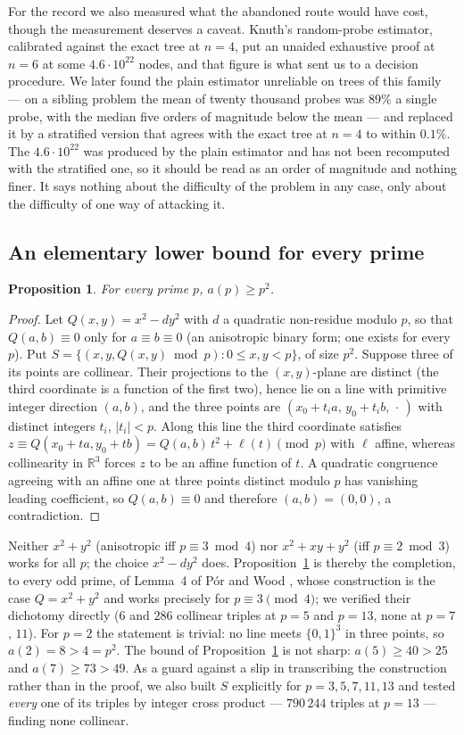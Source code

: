 \documentclass[11pt,a4paper]{article}
\newtheorem{proposition}[theorem]{Proposition}
\begin{document}
For the record we also measured what the abandoned route would have cost, though the measurement deserves a
caveat.  Knuth's random-probe estimator, calibrated against the exact tree at $n=4$, put an unaided exhaustive
proof at $n=6$ at some $4.6\cdot10^{22}$ nodes, and that figure is what sent us to a decision procedure.  We
later found the plain estimator unreliable on trees of this family --- on a sibling problem the mean of twenty
thousand probes was $89\%$ a single probe, with the median five orders of magnitude below the mean --- and
replaced it by a stratified version that agrees with the exact tree at $n=4$ to within $0.1\%$.  The
$4.6\cdot10^{22}$ was produced by the plain estimator and has not been recomputed with the stratified one, so
it should be read as an order of magnitude and nothing finer.  It says nothing about the difficulty of the
problem in any case, only about the difficulty of one way of attacking it.

\subsection{An elementary lower bound for every prime}\label{s:prime}
\begin{proposition}\label{p:alg}
For every prime $p$, $a(p)\ge p^2$.
\end{proposition}
\begin{proof}
Let $Q(x,y)=x^2-dy^2$ with $d$ a quadratic non-residue modulo $p$, so that $Q(a,b)\equiv0$ only for
$a\equiv b\equiv0$ (an anisotropic binary form; one exists for every $p$).  Put
$S=\{(x,y,Q(x,y)\bmod p):0\le x,y<p\}$, of size $p^2$.  Suppose three of its points are collinear.  Their
projections to the $(x,y)$-plane are distinct (the third coordinate is a function of the first two), hence lie
on a line with primitive integer direction $(a,b)$, and the three points are $(x_0+t_ia,\,y_0+t_ib,\,\cdot\,)$
with distinct integers $t_i$, $|t_i|<p$.  Along this line the third coordinate satisfies
$z\equiv Q(x_0+ta,y_0+tb)=Q(a,b)\,t^2+\ell(t)\pmod p$ with $\ell$ affine, whereas collinearity in
$\mathbb R^3$ forces $z$ to be an affine function of $t$.  A quadratic congruence agreeing with an affine one
at three points distinct modulo $p$ has vanishing leading coefficient, so $Q(a,b)\equiv0$ and therefore
$(a,b)=(0,0)$, a contradiction.
\end{proof}
Neither $x^2+y^2$ (anisotropic iff $p\equiv3\bmod 4$) nor $x^2+xy+y^2$ (iff $p\equiv2\bmod3$) works for all
$p$; the choice $x^2-dy^2$ does.  Proposition~\ref{p:alg} is thereby the completion, to every odd prime, of
Lemma~4 of P\'or and Wood \cite{PorWood}, whose construction is the case $Q=x^2+y^2$ and works precisely for
$p\equiv3\pmod4$; we verified their dichotomy directly ($6$ and $286$ collinear triples at $p=5$ and $p=13$, none
at $p=7$, $11$).  For $p=2$ the statement is trivial: no line meets $\{0,1\}^3$ in three points, so
$a(2)=8>4=p^2$.  The bound of Proposition~\ref{p:alg} is not sharp: $a(5)\ge40>25$ and
$a(7)\ge73>49$.  As a guard against a slip in transcribing the construction rather than in the proof,
we also built $S$ explicitly for $p=3,5,7,11,13$ and tested \emph{every} one of its triples by integer cross
product --- $790\,244$ triples at $p=13$ --- finding none collinear.
\end{document}
